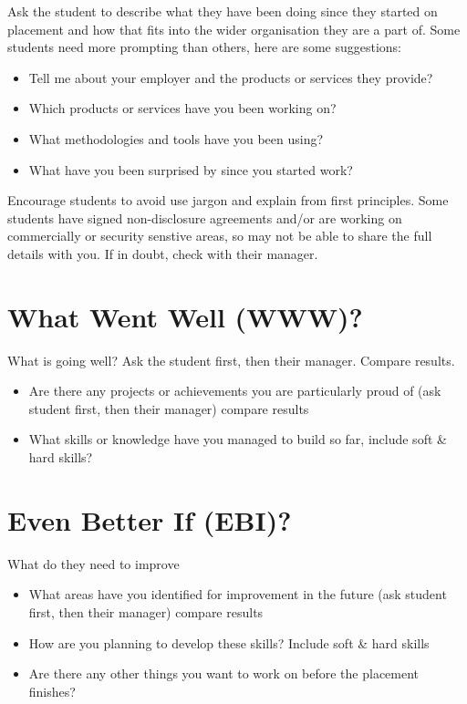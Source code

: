 \documentclass[
]{book}
\providecommand{\tightlist}{%
  \setlength{\itemsep}{0pt}\setlength{\parskip}{0pt}}
\begin{document}
Ask the student to describe what they have been doing since they started on placement and how that fits into the wider organisation they are a part of. Some students need more prompting than others, here are some suggestions:

\begin{itemize}
\tightlist
\item
  Tell me about your employer and the products or services they provide?
\item
  Which products or services have you been working on?
\item
  What methodologies and tools have you been using?
\item
  What have you been surprised by since you started work?
\end{itemize}

Encourage students to avoid use jargon and explain from first principles. Some students have signed non-disclosure agreements and/or are working on commercially or security senstive areas, so may not be able to share the full details with you. If in doubt, check with their manager.

\section{What Went Well (WWW)?}\label{www}

What is going well? Ask the student first, then their manager. Compare results.

\begin{itemize}
\tightlist
\item
  Are there any projects or achievements you are particularly proud of (ask student first, then their manager) compare results
\item
  What skills or knowledge have you managed to build so far, include soft \& hard skills?
\end{itemize}

\section{Even Better If (EBI)?}\label{ebi}

What do they need to improve

\begin{itemize}
\tightlist
\item
  What areas have you identified for improvement in the future (ask student first, then their manager) compare results
\item
  How are you planning to develop these skills? Include soft \& hard skills
\item
  Are there any other things you want to work on before the placement finishes?
\end{itemize}
\end{document}
